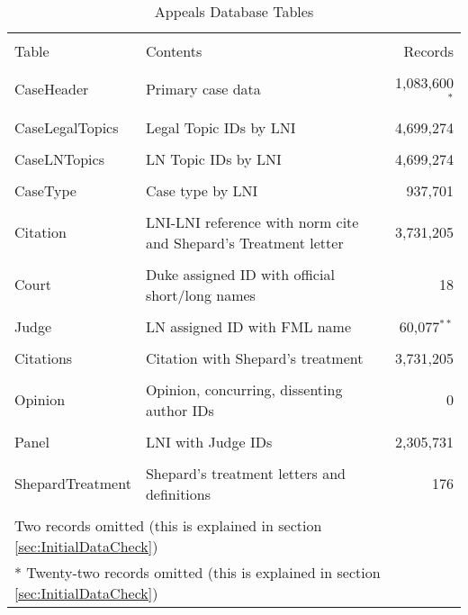 \documentclass[10pt, letterpaper]{article}
\begin{document}
\begin{spacing}{1.0}
\begin{table}[h!]
    \centering
    \caption{Appeals Database Tables}
    \begin{tabular}{p{1.5in}p{3in}lr}
        \hline\\[-8pt]
        Table & Contents & & Records \\[2pt]
        \hline\\[-6pt]
        CaseHeader & Primary case data & & 1,083,600$^*$ \\[8pt]
        & & & \\[-8pt]
        CaseLegalTopics & Legal Topic IDs by LNI & & 4,699,274 \\[8pt]
        & & & \\[-8pt]
        CaseLNTopics & LN Topic IDs by LNI & & 4,699,274 \\[8pt]
        & & & \\[-8pt]
        CaseType & Case type by LNI & & 937,701 \\[8pt]
        & & & \\[-8pt]
        Citation & LNI-LNI reference with norm cite and Shepard's Treatment letter & & 3,731,205 \\[8pt]
        & & & \\[-8pt]
        Court & Duke assigned ID with official short/long names & & 18 \\[8pt]
        & & & \\[-8pt]
        Judge & LN assigned ID with FML name & & 60,077$^{**}$ \\[8pt]
        & & & \\[-8pt]
        Citations & Citation with Shepard's treatment & & 3,731,205\\[8pt]
        & & & \\[-8pt]
        Opinion & Opinion, concurring, dissenting author IDs & & 0 \\
        & & & \\[-8pt]
        Panel & LNI with Judge IDs & & 2,305,731 \\
        & & & \\[-8pt]
        ShepardTreatment & Shepard's treatment letters and definitions & & 176\\ [6pt]
        \hline\\[-6pt]
        \multicolumn{4}{l}{\small * Two records omitted (this is explained in section \ref{sec:InitialDataCheck})} \\
        \multicolumn{4}{l}{\small ** Twenty-two records omitted (this is explained in section \ref{sec:InitialDataCheck})} \\
    \end{tabular}
    \label{tb:TableSummary}
\end{table}


\end{spacing}
\end{document}
